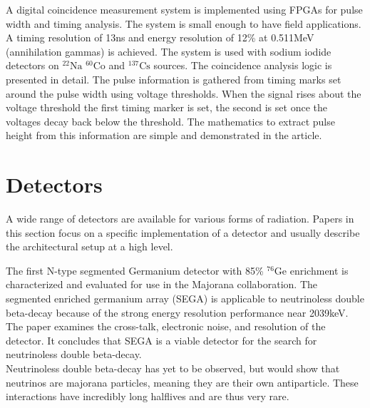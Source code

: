 \documentclass[12pt]{article}
\begin{document}
\begin{doublespacing}
{\large\textbf{\cite{Zhu2011454}}}

A digital coincidence measurement system is implemented using FPGAs for pulse width and timing analysis. The system is small enough to have field applications. A timing resolution of 13ns and energy resolution of 12\% at 0.511MeV (annihilation gammas) is achieved. The system is used with sodium iodide detectors on $^{22}\mbox{Na}$ $^{60}\mbox{Co}$ and $^{137}\mbox{Cs}$ sources. The coincidence analysis logic is presented in detail. The pulse information is gathered from timing marks set around the pulse width using voltage thresholds. When the signal rises about the voltage threshold the first timing marker is set, the second is set once the voltages decay back below the threshold. The mathematics to extract pulse height from this information are simple and demonstrated in the article.
\\[20pt]


\pagebreak
\section{Detectors}   %
A wide range of detectors are available for various forms of radiation. Papers in this section focus on a specific implementation of a detector and usually describe the architectural setup at a high level.
\\[20pt]

{\large\textbf{\cite{Leviner201466}}}

The first N-type segmented Germanium detector with 85\% $^{76}\mbox{Ge}$ enrichment is characterized and evaluated for use in the Majorana collaboration. The segmented enriched germanium array (SEGA) is applicable to neutrinoless double beta-decay because of the strong energy resolution performance near 2039keV. The paper examines the cross-talk, electronic noise, and resolution of the detector. It concludes that SEGA is a viable detector for the search for neutrinoless double beta-decay.
\\
Neutrinoless double beta-decay has yet to be observed, but would show that neutrinos are majorana particles, meaning they are their own antiparticle. These interactions have incredibly long halflives and are thus very rare.
\\[20pt]


{\large\textbf{\cite{Sangsingkeow2003183}}}


\end{doublespacing}
\end{document}
